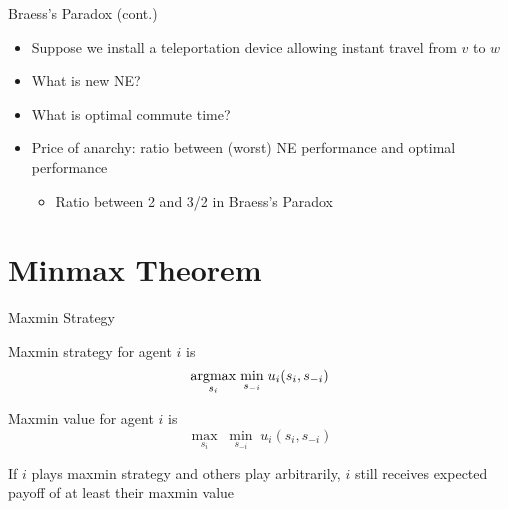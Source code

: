 \documentclass[11pt,aspectratio=169]{beamer}
\begin{document}
  \begin{frame}{Braess's Paradox (cont.)}
   \begin{center}
   \end{center}
   \begin{itemize}
    \item Suppose we install a teleportation device allowing instant travel from $v$ to $w$
    \item What is new NE? 
    \item What is optimal commute time?
    \item \alert{Price of anarchy}: ratio between (worst) NE performance and optimal performance
    \begin{itemize}[<+->]
     \item Ratio between 2 and 3/2 in Braess's Paradox
    \end{itemize}
   \end{itemize}
  \end{frame}
  
 \section{Minmax Theorem} 
  \begin{frame}{Maxmin Strategy}
   \begin{itemizes}
    \item \alert{Maxmin strategy} for agent $i$ is 
    $$\underset{s_i}{\operatorname*{argmax}} \; \underset{s_{-i}}{\min} \; u_i(s_i,s_{-i})$$
    \item Maxmin value for agent $i$ is 
    $$\underset{s_i}{\max} \; \underset{s_{-i}}{\min} \; u_i(s_i,s_{-i})$$
    \item If $i$ plays maxmin strategy and others play arbitrarily, $i$ still receives expected payoff of at least their maxmin value
   \end{itemizes}
  \end{frame}
  
\end{document}
